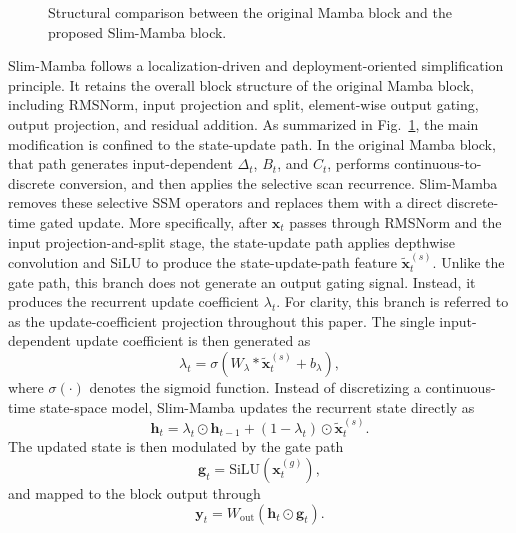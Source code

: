 \documentclass[lettersize,journal]{IEEEtran}
\begin{document}
\begin{figure}[!t]
  \centering
    
    \caption{Structural comparison between the original Mamba block and the proposed
    Slim-Mamba block.}
    \label{fig:slim_mamba_replacement}
\end{figure}

Slim-Mamba follows a localization-driven and deployment-oriented simplification
principle. It retains the overall block structure of the original Mamba block,
including RMSNorm, input projection and split, element-wise output gating,
output projection, and residual addition. As summarized in
Fig.~\ref{fig:slim_mamba_replacement}, the main modification is confined to the
state-update path. In the original Mamba block, that path generates
input-dependent \(\Delta_t\), \(B_t\), and \(C_t\), performs
continuous-to-discrete conversion, and then applies the selective scan
recurrence. Slim-Mamba removes these selective SSM operators and replaces them
with a direct discrete-time gated update. More specifically, after
\(\mathbf{x}_t\) passes through RMSNorm and the input projection-and-split
stage, the state-update path applies depthwise convolution and SiLU to produce
the state-update-path feature \(\tilde{\mathbf{x}}^{(s)}_t\). Unlike the gate
path, this branch does not generate an output gating signal. Instead, it
produces the recurrent update coefficient \(\lambda_t\). For clarity, this
branch is referred to as the update-coefficient projection throughout this
paper. The single input-dependent update coefficient is then generated as
\begin{equation}
\lambda_t = \sigma \!\left(W_{\lambda} * \tilde{\mathbf{x}}^{(s)}_t + b_{\lambda}\right),
\label{eq:slim_mamba_lambda}
\end{equation}
where \(\sigma(\cdot)\) denotes the sigmoid function. Instead of discretizing a
continuous-time state-space model, Slim-Mamba updates the recurrent state
directly as
\begin{equation}
\mathbf{h}_t = \lambda_t \odot \mathbf{h}_{t-1}
 + (1-\lambda_t)\odot \tilde{\mathbf{x}}^{(s)}_t.
\label{eq:slim_mamba_state_update_alg}
\end{equation}
The updated state is then modulated by the gate path
\begin{equation}
\mathbf{g}_t = \mathrm{SiLU}(\mathbf{x}^{(g)}_t),
\label{eq:slim_mamba_gate}
\end{equation}
and mapped to the block output through
\begin{equation}
\mathbf{y}_t = W_{\mathrm{out}}(\mathbf{h}_t \odot \mathbf{g}_t).
\label{eq:slim_mamba_output}
\end{equation}
\end{document}
